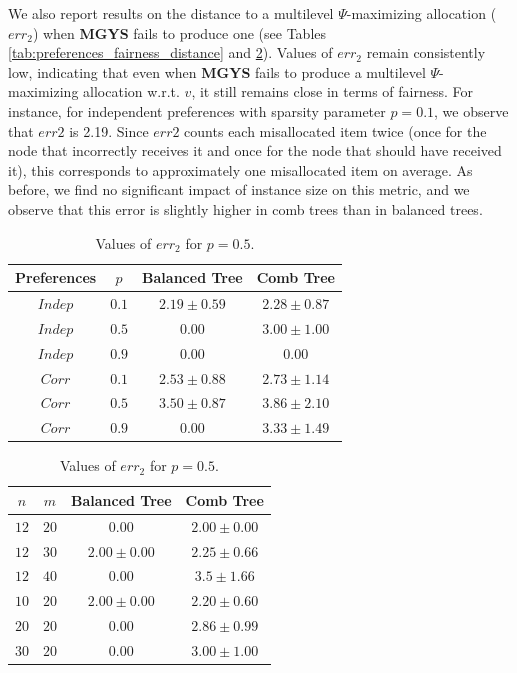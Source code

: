 \documentclass[]{article}
\begin{document}
We also report results on the distance to a multilevel $\Psi$-maximizing allocation ($err_2$) when \textbf{MGYS} fails to produce one (see Tables \ref{tab:preferences_fairness_distance} and \ref{tab:m_size_fairness_distance}). Values of $err_2$ remain consistently low, indicating that even when \textbf{MGYS} fails to produce a multilevel $\Psi$-maximizing allocation w.r.t. $v$, it still remains close in terms of fairness. For instance, for independent preferences with sparsity parameter $p=0.1$, we observe that  $err2$ is 2.19. Since $err2$ counts each misallocated item twice (once for the node that incorrectly receives it and once for the node that should have received it), this corresponds to approximately one misallocated item on average. As before, we find no significant impact of instance size on this metric, and we observe that this error is slightly higher in comb trees than in balanced trees.

\begin{table}[h!]
\small
\centering
\begin{minipage}{0.48\textwidth}
  \centering
  \caption{Values of $err_2$ for $n=15$ and $m=25$.}
  \begin{tabular}{|c|c|c|c|}
    \hline
    Preferences & $p$ & Balanced Tree & Comb Tree \\
    \hline
    $Indep$ & $0.1$ & $2.19 \pm 0.59$ & $2.28 \pm 0.87$ \\
    $Indep$ & $0.5$ & $0.00$ & $3.00 \pm 1.00$ \\
    $Indep$ & $0.9$ & $0.00$ & $0.00$ \\
    \hline
    $Corr$ & $0.1$ & $2.53 \pm 0.88$ & $2.73 \pm 1.14$ \\
    $Corr$ & $0.5$ & $3.50 \pm 0.87$ & $3.86 \pm 2.10$ \\
    $Corr$ & $0.9$ & $0.00$ & $3.33 \pm 1.49$ \\
    \hline
  \end{tabular}
  \label{tab:preferences_fairness_distance}
\end{minipage}
\hfill
\begin{minipage}{0.48\textwidth}
  \centering
  \caption{ Values of $err_2$ for $p=0.5$.}
  \begin{tabular}{|c|c|c|c|}
    \hline
    $n$ & $m$ & Balanced Tree & Comb Tree \\
    \hline
    $12$ & $20$ & $0.00$ & $2.00 \pm 0.00$ \\
    $12$ & $30$ & $2.00 \pm 0.00$ & $2.25 \pm 0.66$ \\
    $12$ & $40$ & $0.00$ & $3.5 \pm 1.66$ \\
    \hline
    $10$ & $20$ & $2.00 \pm 0.00$ & $2.20 \pm 0.60$ \\
    $20$ & $20$ & $0.00$ & $2.86 \pm 0.99$ \\
    $30$ & $20$ & $0.00$ & $3.00 \pm 1.00$ \\
    \hline
  \end{tabular}
  \label{tab:m_size_fairness_distance}
\end{minipage}
\end{table}
\end{document}
